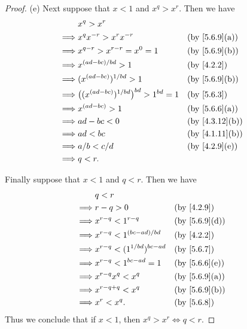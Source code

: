 \begin{proof}{(e)}
  Next suppose that \(x < 1\) and \(x^q > x^r\).
  Then we have
  \begin{align*}
             & x^q > x^r                                                                              \\
    \implies & x^q x^{-r} > x^r x^{-r}                              &  & \text{(by \cref{5.6.9}(a))}  \\
    \implies & x^{q - r} > x^{r - r} = x^0 = 1                      &  & \text{(by \cref{5.6.9}(b))}  \\
    \implies & x^{(ad - bc) / bd} > 1                               &  & \text{(by \cref{4.2.2})}     \\
    \implies & (x^{(ad - bc)})^{1 / bd} > 1                         &  & \text{(by \cref{5.6.9}(b))}  \\
    \implies & \big((x^{(ad - bc)})^{1 / bd}\big)^{bd} > 1^{bd} = 1 &  & \text{(by \cref{5.6.3})}     \\
    \implies & x^{(ad - bc)} > 1                                    &  & \text{(by \cref{5.6.6}(a))}  \\
    \implies & ad - bc < 0                                          &  & \text{(by \cref{4.3.12}(b))} \\
    \implies & ad < bc                                              &  & \text{(by \cref{4.1.11}(b))} \\
    \implies & a / b < c / d                                        &  & \text{(by \cref{4.2.9}(e))}  \\
    \implies & q < r.
  \end{align*}

  Finally suppose that \(x < 1\) and \(q < r\).
  Then we have
  \begin{align*}
             & q < r                                                               \\
    \implies & r - q > 0                          &  & \text{(by \cref{4.2.9})}    \\
    \implies & x^{r - q} < 1^{r - q}              &  & \text{(by \cref{5.6.9}(d))} \\
    \implies & x^{r - q} < 1^{(bc - ad) / bd}     &  & \text{(by \cref{4.2.2})}    \\
    \implies & x^{r - q} < (1^{1 / bd})^{bc - ad} &  & \text{(by \cref{5.6.7})}    \\
    \implies & x^{r - q} < 1^{bc - ad} = 1        &  & \text{(by \cref{5.6.6}(e))} \\
    \implies & x^{r - q} x^q < x^q                &  & \text{(by \cref{5.6.9}(a))} \\
    \implies & x^{r - q + q} < x^q                &  & \text{(by \cref{5.6.9}(b))} \\
    \implies & x^r < x^q.                         &  & \text{(by \cref{5.6.8})}
  \end{align*}
  Thus we conclude that if \(x < 1\), then \(x^q > x^r \iff q < r\).
\end{proof}

